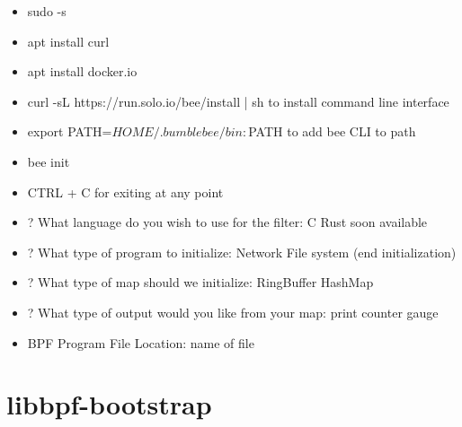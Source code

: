 \begin{itemize}
	\item sudo -s
	\item apt install curl
	\item apt install docker.io 
	\item curl -sL https://run.solo.io/bee/install | sh to install command line interface
	\item export PATH=$HOME/.bumblebee/bin:$PATH to add bee CLI to path
	\item bee init
	\item CTRL + C for exiting at any point
	\item ? What language do you wish to use for the filter: 
		C
		Rust soon available
	\item ? What type of program to initialize: 
		Network
	File system (end initialization)
	\item ? What type of map should we initialize: 
		RingBuffer
		HashMap
	\item ? What type of output would you like from your map: 
		print
		counter
		gauge
	\item BPF Program File Location: name of file
\end{itemize}


\section{libbpf-bootstrap}




